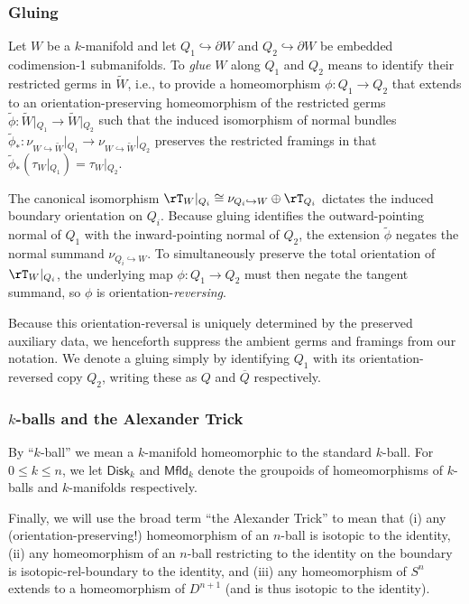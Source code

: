 \documentclass[12pt,reqno]{amsart}
\newcommand{\Mfld}{\mathsf{Mfld}}
\newcommand{\Disk}{\mathsf{Disk}}
\newcommand{\tld}[1]{{\widetilde{#1}}}
\newcommand{\orev}{\overline}
\newcommand{\defn}[1]{\emph{#1}}
\begin{document}
\subsubsection{Gluing}
Let $W$ be a $k$-manifold and let $Q_1\hookrightarrow \partial W$ and $Q_2\hookrightarrow \partial W$ be embedded codimension-1 submanifolds. To \defn{glue} $W$ along $Q_1$ and $Q_2$ means to identify their restricted germs in $\tld W$, i.e., to provide a homeomorphism $\phi \colon Q_1 \to Q_2$ that extends to an orientation-preserving homeomorphism of the restricted germs $\tld\phi \colon \tld W\vert{}_{Q_1}\to \tld W\vert{}_{Q_2}$ such that the induced isomorphism of normal bundles $\widetilde{\phi}_* \colon \nu_{W \hookrightarrow \widetilde{W}}\vert{}_{Q_1} \to \nu_{W \hookrightarrow \widetilde{W}}\vert{}_{Q_2}$ preserves the restricted framings in that $\widetilde{\phi}_*(\tau_{W}\vert{}_{Q_1})=\tau_{W}\vert{}_{Q_2}$.

The canonical isomorphism $\rT_{W}\vert{}_{Q_i} \cong \nu_{Q_i\hookrightarrow W} \oplus \rT_{Q_i}$ dictates the induced boundary orientation on $Q_i$. Because gluing identifies the outward-pointing normal of $Q_1$ with the inward-pointing normal of $Q_2$, the extension $\widetilde{\phi}$ negates the normal summand $\nu_{Q_i\hookrightarrow W}$. To simultaneously preserve the total orientation of $\rT_{W}\vert_{Q_i}$, the underlying map $\phi \colon Q_1 \to Q_2$ must then negate the tangent summand, so $\phi$ is orientation-\emph{reversing}.

Because this orientation-reversal is uniquely determined by the preserved auxiliary data, we henceforth suppress the ambient germs and framings from our notation. We denote a gluing simply by identifying $Q_1$ with its orientation-reversed copy $Q_2$, writing these as $Q$ and $\orev{Q}$ respectively.

\subsubsection{\texorpdfstring{$k$}{k}-balls and the Alexander Trick}
By ``$k$-ball'' we mean a $k$-manifold homeomorphic to the standard $k$-ball. For $0\leq k\leq n$, we let $\Disk_k$ and $\Mfld_k$ denote the groupoids of homeomorphisms of $k$-balls and $k$-manifolds respectively.

Finally, we will use the broad term ``the Alexander Trick'' to mean that (i) any (orientation-preserving!) homeomorphism of an $n$-ball is isotopic to the identity, (ii) any homeomorphism of an $n$-ball restricting to the identity on the boundary is isotopic-rel-boundary to the identity, and (iii) any homeomorphism of $S^n$ extends to a homeomorphism of $D^{n+1}$ (and is thus isotopic to the identity).
\end{document}

